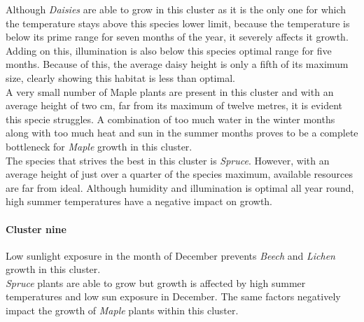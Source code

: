 Although \textit{Daisies} are able to grow in this cluster as it is the only one for which the temperature stays above this species lower limit, because the temperature is below its prime range for seven months of the year, it severely affects it growth. Adding on this, illumination is also below this species optimal range for five months. Because of this, the average daisy height is only a fifth of its maximum size, clearly showing this habitat is less than optimal.\\
A very small number of Maple plants are present in this cluster and with an average height of two cm, far from its maximum of twelve metres, it is evident this specie struggles. A combination of too much water in the winter months along with too much heat and sun in the summer months proves to be a complete bottleneck for \textit{Maple} growth in this cluster.\\
The species that strives the best in this cluster is \textit{Spruce}. However, with an average height of just over a quarter of the species maximum, available resources are far from ideal. Although humidity and illumination is optimal all year round, high summer temperatures have a negative impact on growth.\\

\paragraph{Cluster nine}

Low sunlight exposure in the month of December prevents \textit{Beech} and \textit{Lichen} growth in this cluster.\\
\textit{Spruce} plants are able to grow but growth is affected by high summer temperatures and low sun exposure in December. The same factors negatively impact the growth of \textit{Maple} plants within this cluster.\\